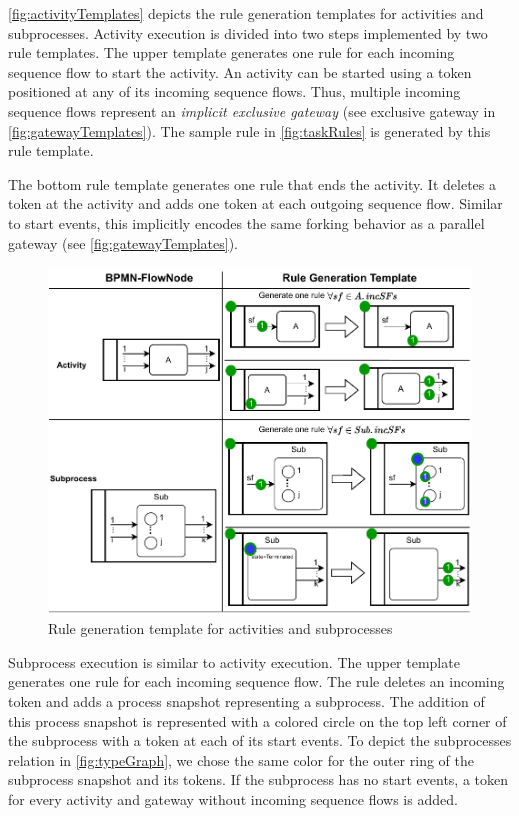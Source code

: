\documentclass[submission, copyright, creativecommons]{eptcs}
\begin{document}
\autoref{fig:activityTemplates} depicts the rule generation templates for activities and subprocesses.
Activity execution is divided into two steps implemented by two rule templates.
The upper template generates one rule for each incoming sequence flow to start the activity.
An activity can be started using a token positioned at any of its incoming sequence flows.
Thus, multiple incoming sequence flows represent an \textit{implicit exclusive gateway} (see exclusive gateway in \autoref{fig:gatewayTemplates}).
The sample rule in \autoref{fig:taskRules} is generated by this rule template.

The bottom rule template generates one rule that ends the activity.
It deletes a token at the activity and adds one token at each outgoing sequence flow.
Similar to start events, this implicitly encodes the same forking behavior as a parallel gateway (see \autoref{fig:gatewayTemplates}). 

\begin{figure}[h]
    \centering
    \includegraphics[width=1\textwidth]{images/activities_template.pdf}
    \caption{Rule generation template for activities and subprocesses}
    \label{fig:activityTemplates}
\end{figure}

Subprocess execution is similar to activity execution.
The upper template generates one rule for each incoming sequence flow.
The rule deletes an incoming token and adds a process snapshot representing a subprocess. 
The addition of this process snapshot is represented with a colored circle on the top left corner of the subprocess with a token at each of its start events.
To depict the \textsf{subprocesses} relation in \autoref{fig:typeGraph}, we chose the same color for the outer ring of the subprocess snapshot and its tokens.
If the subprocess has no start events, a token for every activity and gateway without incoming sequence flows is added. %
\end{document}
